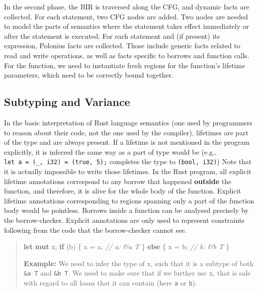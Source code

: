 \documentclass[
  11pt,
  twoside,symmetric]{report}
\newenvironment{Shaded}{}{}
\newcommand{\CommentTok}[1]{\textit{#1}}
\newcommand{\ControlFlowTok}[1]{\textbf{#1}}
\newcommand{\KeywordTok}[1]{\textbf{#1}}
\newcommand{\NormalTok}[1]{#1}
\newcommand{\OperatorTok}[1]{#1}
\begin{document}
In the second phase, the BIR is traversed along the CFG, and dynamic
facts are collected. For each statement, two CFG nodes are added. Two
nodes are needed to model the parts of semantics where the statement
takes effect immediately or after the statement is executed. For each
statement and (if present) its expression, Polonius facts are collected.
Those include generic facts related to read and write operations, as
well as facts specific to borrows and function calls. For the function,
we need to instantiate fresh regions for the function's lifetime
parameters, which need to be correctly bound together.

\hypertarget{subtyping-and-variance}{%
\subsection{Subtyping and Variance}\label{subtyping-and-variance}}

In the basic interpretation of Rust language semantics (one used by
programmers to reason about their code, not the one used by the
compiler), lifetimes are part of the type and are always present. If a
lifetime is not mentioned in the program explicitly, it is inferred the
same way as a part of type would be (e.g.,
\texttt{let\ a\ =\ (\_,\ i32)\ =\ (true,\ 5);} completes the type to
\texttt{(bool,\ i32)}) Note that it is actually impossible to write
those lifetimes. In the Rust program, all explicit lifetime annotations
correspond to any borrow that happened \textbf{outside} the function,
and therefore, it is alive for the whole body of the function. Explicit
lifetime annotations corresponding to regions spanning only a part of
the function body would be pointless. Borrows inside a function can be
analysed precisely by the borrow-checker. Explicit annotations are only
used to represent constraints following from the code that the
borrow-checker cannot see.

\begin{quote}
\begin{Shaded}
\begin{Highlighting}[]
 \KeywordTok{let} \KeywordTok{mut}\NormalTok{ x}\OperatorTok{;}
 \ControlFlowTok{if}\NormalTok{ (b) }\OperatorTok{\{}
\NormalTok{     x }\OperatorTok{=}\NormalTok{ a}\OperatorTok{;} \CommentTok{// a: \&\textquotesingle{}a T}
 \OperatorTok{\}} \ControlFlowTok{else} \OperatorTok{\{}
\NormalTok{     x }\OperatorTok{=}\NormalTok{ b}\OperatorTok{;} \CommentTok{// b: \&\textquotesingle{}b T}
 \OperatorTok{\}}
\end{Highlighting}
\end{Shaded}

\textbf{Example:} We need to infer the type of x, such that it is a
subtype of both \texttt{\&\textquotesingle{}a\ T} and
\texttt{\&\textquotesingle{}b\ T}. We need to make sure that if we
further use x, that is safe with regard to all loans that it can contain
(here \texttt{a} or \texttt{b}).
\end{quote}
\end{document}

